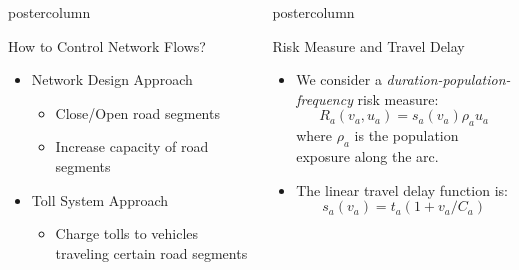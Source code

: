 \documentclass[final]{beamer}
\def\red{\color{red}}
\newlength{\columnheight}
\begin{document}
\begin{frame}
\begin{columns}
\begin{column}{0.32\textwidth}
\begin{beamercolorbox}[center,wd=\textwidth]{postercolumn}
\begin{minipage}[T]{.95\textwidth}
{  \begin{block}{How to Control Network Flows?}
    \begin{itemize}
    \item Network Design Approach
    	\begin{itemize}
    	\item Close/Open road segments
    	\item Increase capacity of road segments
    	\end{itemize}
    \item Toll System Approach
    	\begin{itemize}
    	\item Charge tolls to vehicles traveling certain road segments
    	\end{itemize}
    \end{itemize}
  \end{block}


}
\end{minipage}
\end{beamercolorbox}
\end{column}
\begin{column}{0.32\textwidth}
\begin{beamercolorbox}[center,wd=\textwidth]{postercolumn}
\begin{minipage}[T]{.95\textwidth}
\parbox[t][\columnheight]{\textwidth}{


  \begin{block}{Risk Measure and Travel Delay}
    \begin{itemize}
    \item We consider a \emph{\red duration-population-frequency} risk measure:
    \[
    R_a(v_a,u_a) = s_a(v_a) \rho_a u_a
    \]
    where $\rho_a$ is the population exposure along the arc.
    \item The linear travel delay function is:
    \[
    s_a(v_a) = t_a \left( 1 + v_a / C_a \right)
    \]
    \end{itemize}
  \end{block}



}
\end{minipage}
\end{beamercolorbox}
\end{column}
\end{columns}
\end{frame}
\end{document}
